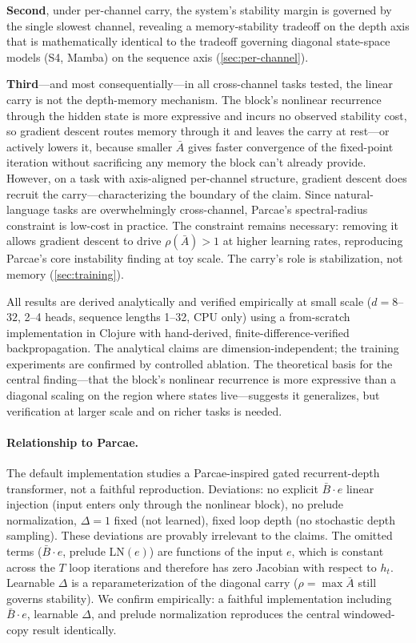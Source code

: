 \documentclass[11pt]{article}
\begin{document}
\textbf{Second}, under per-channel carry, the system's stability margin is governed by the single slowest channel, revealing a memory-stability tradeoff on the depth axis that is mathematically identical to the tradeoff governing diagonal state-space models (S4, Mamba) on the sequence axis (\cref{sec:per-channel}).

\textbf{Third}---and most consequentially---in all cross-channel tasks tested, the linear carry is not the depth-memory mechanism. The block's nonlinear recurrence through the hidden state is more expressive and incurs no observed stability cost, so gradient descent routes memory through it and leaves the carry at rest---or actively lowers it, because smaller $\bar{A}$ gives faster convergence of the fixed-point iteration without sacrificing any memory the block can't already provide. However, on a task with axis-aligned per-channel structure, gradient descent does recruit the carry---characterizing the boundary of the claim. Since natural-language tasks are overwhelmingly cross-channel, Parcae's spectral-radius constraint is low-cost in practice. The constraint remains necessary: removing it allows gradient descent to drive $\rho(\bar{A}) > 1$ at higher learning rates, reproducing Parcae's core instability finding at toy scale. The carry's role is stabilization, not memory (\cref{sec:training}).

All results are derived analytically and verified empirically at small scale ($d=8$--$32$, 2--4 heads, sequence lengths 1--32, CPU only) using a from-scratch implementation in Clojure with hand-derived, finite-difference-verified backpropagation. The analytical claims are dimension-independent; the training experiments are confirmed by controlled ablation. The theoretical basis for the central finding---that the block's nonlinear recurrence is more expressive than a diagonal scaling on the region where states live---suggests it generalizes, but verification at larger scale and on richer tasks is needed.

\paragraph{Relationship to Parcae.} The default implementation studies a Parcae-inspired gated recurrent-depth transformer, not a faithful reproduction. Deviations: no explicit $\bar{B} \cdot e$ linear injection (input enters only through the nonlinear block), no prelude normalization, $\Delta = 1$ fixed (not learned), fixed loop depth (no stochastic depth sampling). These deviations are provably irrelevant to the claims. The omitted terms ($\bar{B} \cdot e$, prelude $\text{LN}(e)$) are functions of the input $e$, which is constant across the $T$ loop iterations and therefore has zero Jacobian with respect to $h_t$. Learnable $\Delta$ is a reparameterization of the diagonal carry ($\rho = \max \bar{A}$ still governs stability). We confirm empirically: a faithful implementation including $\bar{B} \cdot e$, learnable $\Delta$, and prelude normalization reproduces the central windowed-copy result identically.
\end{document}
